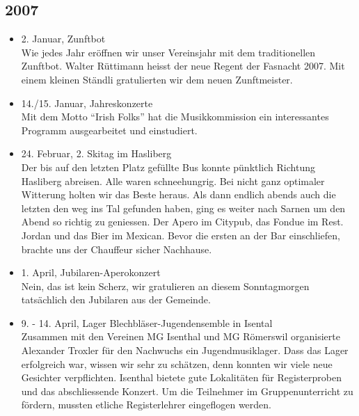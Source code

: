 \subsection{2007}

\begin{history}


    \begin{itemize}

        \item 2. Januar, Zunftbot\\
              Wie jedes Jahr eröffnen wir unser Vereinsjahr mit dem traditionellen
              Zunftbot. Walter Rüttimann heisst der neue Regent der Fasnacht 2007. Mit
              einem kleinen Ständli gratulierten wir dem neuen Zunftmeister.

        \item 14./15. Januar, Jahreskonzerte\\
              Mit dem Motto \enquote{Irish Folks} hat die Musikkommission ein
              interessantes Programm ausgearbeitet und einstudiert.

        \item 24. Februar, 2. Skitag im Hasliberg\\
              Der bis auf den letzten Platz gefüllte Bus konnte pünktlich Richtung
              Hasliberg abreisen. Alle waren schneehungrig. Bei nicht ganz optimaler
              Witterung holten wir das Beste heraus. Als dann endlich abends auch die
              letzten den weg ins Tal gefunden haben, ging es weiter nach Sarnen um
              den Abend so richtig zu geniessen. Der Apero im Citypub, das Fondue im
              Rest. Jordan und das Bier im Mexican. Bevor die ersten an der Bar
              einschliefen, brachte uns der Chauffeur sicher Nachhause.

        \item 1. April, Jubilaren-Aperokonzert\\
              Nein, das ist kein Scherz, wir gratulieren an diesem Sonntagmorgen
              tatsächlich den Jubilaren aus der Gemeinde.

        \item 9. - 14. April, Lager Blechbläser-Jugendensemble in Isental\\
              Zusammen mit den Vereinen MG Isenthal und MG Römerswil organisierte
              Alexander Troxler für den Nachwuchs ein Jugendmusiklager. Dass das Lager
              erfolgreich war, wissen wir sehr zu schätzen, denn konnten wir viele
              neue Gesichter verpflichten. Isenthal bietete gute Lokalitäten für
              Registerproben und das abschliessende Konzert. Um die Teilnehmer im
              Gruppenunterricht zu fördern, mussten etliche Registerlehrer eingeflogen
              werden.


\end{itemize}
\end{history}
